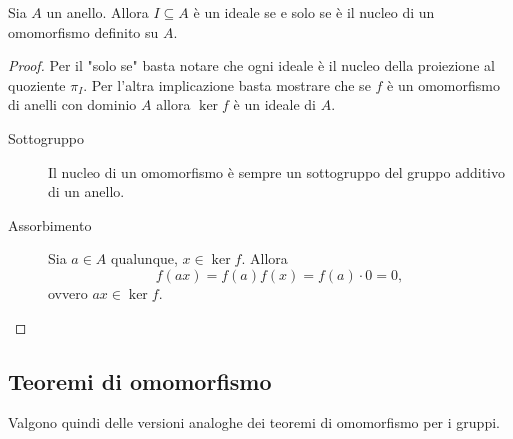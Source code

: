 \begin{proposition}{}{}
    Sia $A$ un anello. Allora $I \subseteq A$ è un ideale se e solo se è il nucleo di un omomorfismo definito su $A$.
\end{proposition}
\begin{proof}
    Per il "solo se" basta notare che ogni ideale è il nucleo della proiezione al quoziente $\pi_I$. Per l'altra implicazione basta mostrare che se $f$ è un omomorfismo di anelli con dominio $A$ allora $\ker f$ è un ideale di $A$.
    \begin{description}
        \item[Sottogruppo] Il nucleo di un omomorfismo è sempre un sottogruppo del gruppo additivo di un anello.
        \item[Assorbimento] Sia $a \in A$ qualunque, $x \in \ker f$. Allora \[
            f(ax) = f(a)f(x) = f(a) \cdot 0 = 0,    
        \] ovvero $ax \in \ker f$. \qedhere
    \end{description}
\end{proof}

\subsection{Teoremi di omomorfismo}

Valgono quindi delle versioni analoghe dei teoremi di omomorfismo per i gruppi.

